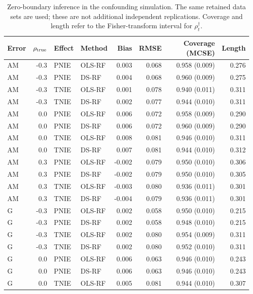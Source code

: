 \begin{table}[htbp]\centering\small\setlength{\tabcolsep}{4pt}
\caption{Zero-boundary inference in the confounding simulation. The same retained data sets are used; these are not additional independent replications. Coverage and length refer to the Fisher-transform interval for $\rho_t^\dagger$.}
\label{tab:curve-thresholds}
\begin{tabular}{lrllrrrr}\toprule
Error & $\rho_{\rm true}$ & Effect & Method & Bias & RMSE & Coverage (MCSE) & Length\\\midrule
AM & -0.3 & PNIE & OLS-RF & 0.003 & 0.068 & 0.958 (0.009) & 0.276\\
AM & -0.3 & PNIE & DS-RF & 0.004 & 0.068 & 0.960 (0.009) & 0.275\\
AM & -0.3 & TNIE & OLS-RF & 0.001 & 0.078 & 0.940 (0.011) & 0.311\\
AM & -0.3 & TNIE & DS-RF & 0.002 & 0.077 & 0.944 (0.010) & 0.311\\
AM & 0.0 & PNIE & OLS-RF & 0.006 & 0.072 & 0.958 (0.009) & 0.290\\
AM & 0.0 & PNIE & DS-RF & 0.006 & 0.072 & 0.960 (0.009) & 0.290\\
AM & 0.0 & TNIE & OLS-RF & 0.008 & 0.081 & 0.946 (0.010) & 0.311\\
AM & 0.0 & TNIE & DS-RF & 0.007 & 0.081 & 0.944 (0.010) & 0.312\\
AM & 0.3 & PNIE & OLS-RF & -0.002 & 0.079 & 0.950 (0.010) & 0.306\\
AM & 0.3 & PNIE & DS-RF & -0.002 & 0.079 & 0.950 (0.010) & 0.305\\
AM & 0.3 & TNIE & OLS-RF & -0.003 & 0.080 & 0.936 (0.011) & 0.301\\
AM & 0.3 & TNIE & DS-RF & -0.004 & 0.079 & 0.936 (0.011) & 0.301\\
\midrule
G & -0.3 & PNIE & OLS-RF & 0.002 & 0.058 & 0.950 (0.010) & 0.215\\
G & -0.3 & PNIE & DS-RF & 0.002 & 0.058 & 0.948 (0.010) & 0.215\\
G & -0.3 & TNIE & OLS-RF & 0.002 & 0.080 & 0.954 (0.009) & 0.311\\
G & -0.3 & TNIE & DS-RF & 0.002 & 0.080 & 0.952 (0.010) & 0.311\\
G & 0.0 & PNIE & OLS-RF & 0.006 & 0.063 & 0.946 (0.010) & 0.243\\
G & 0.0 & PNIE & DS-RF & 0.006 & 0.063 & 0.946 (0.010) & 0.243\\
G & 0.0 & TNIE & OLS-RF & 0.005 & 0.081 & 0.944 (0.010) & 0.307\\

\end{tabular}
\end{table}
